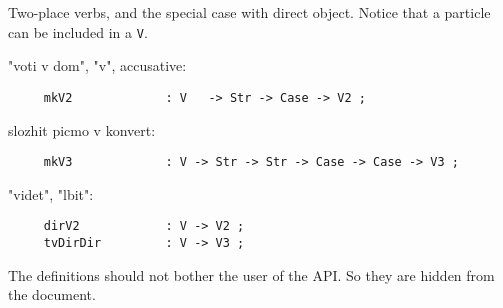 Two-place verbs, and the special case with direct object. Notice
that a particle can be included in a {\tt V}.

\noindent "{\cyr vo\cyrishrt{}ti v dom}", "{\cyr v}", accusative:
\begin{verbatim}
     mkV2             : V   -> Str -> Case -> V2 ;
\end{verbatim}
{\cyr slozhit\cyrsftsn{} pic\cyrsftsn{}mo v konvert}:
\begin{verbatim}
     mkV3             : V -> Str -> Str -> Case -> Case -> V3 ;
\end{verbatim}
"{\cyr videt\cyrsftsn{}}", "{\cyr l\cyryu{}bit\cyrsftsn{}}":
\begin{verbatim}
     dirV2            : V -> V2 ;
     tvDirDir         : V -> V3 ;
\end{verbatim}

The definitions should not bother the user of the API. So they are
hidden from the document.
